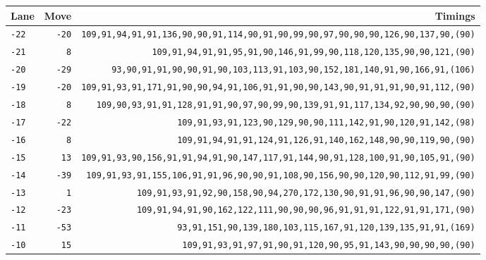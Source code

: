 \begin{table}[!phtb]
	\centering
	\begin{tabular}{@{\hskip 0.31cm}L@{\hskip 0.27cm}r@{\hskip 0.27cm}R@{\hskip 0.34cm}}\toprule
		Lane & Move & Timings \\\midrule
		\texttt{-22} & \texttt{-20} & \footnotesize\texttt{109,91,94,91,91,136,90,90,91,114,90,91,90,99,90,97,90,90,90,126,90,137,90,{\color{gray}(90)}} \\
		\texttt{-21} & \texttt{8} & \footnotesize\texttt{109,91,94,91,91,95,91,90,146,91,99,90,118,120,135,90,90,121,{\color{gray}(90)}} \\
		\texttt{-20} & \texttt{-29} & \footnotesize\texttt{93,90,91,91,90,90,91,90,103,113,91,103,90,152,181,140,91,90,166,91,{\color{gray}(106)}} \\
		\texttt{-19} & \texttt{-20} & \footnotesize\texttt{109,91,93,91,171,91,90,90,94,91,106,91,91,90,90,143,90,91,91,91,90,91,112,{\color{gray}(90)}} \\
		\texttt{-18} & \texttt{8} & \footnotesize\texttt{109,90,93,91,91,128,91,91,90,97,90,99,90,139,91,91,117,134,92,90,90,90,{\color{gray}(90)}} \\
		\texttt{-17} & \texttt{-22} & \footnotesize\texttt{109,91,93,91,123,90,129,90,90,111,142,91,90,120,91,142,{\color{gray}(98)}} \\
		\texttt{-16} & \texttt{8} & \footnotesize\texttt{109,91,94,91,91,124,91,126,91,140,162,148,90,90,119,90,{\color{gray}(90)}} \\
		\texttt{-15} & \texttt{13} & \footnotesize\texttt{109,91,93,90,156,91,91,94,91,90,147,117,91,144,90,91,128,100,91,90,105,91,{\color{gray}(90)}} \\
		\texttt{-14} & \texttt{-39} & \footnotesize\texttt{109,91,93,91,155,106,91,91,96,90,90,91,108,90,156,90,90,120,90,112,91,99,{\color{gray}(90)}} \\
		\texttt{-13} & \texttt{1} & \footnotesize\texttt{109,91,93,91,92,90,158,90,94,270,172,130,90,91,91,96,90,90,147,{\color{gray}(90)}} \\
		\texttt{-12} & \texttt{-23} & \footnotesize\texttt{109,91,94,91,90,162,122,111,90,90,90,96,91,91,91,122,91,91,171,{\color{gray}(90)}} \\
		\texttt{-11} & \texttt{-53} & \footnotesize\texttt{93,91,151,90,139,180,103,115,167,91,120,139,135,91,91,{\color{gray}(169)}} \\
		\texttt{-10} & \texttt{15} & \footnotesize\texttt{109,91,93,91,97,91,90,91,120,90,95,91,143,90,90,90,90,{\color{gray}(90)}} \\

\end{tabular}
\end{table}
